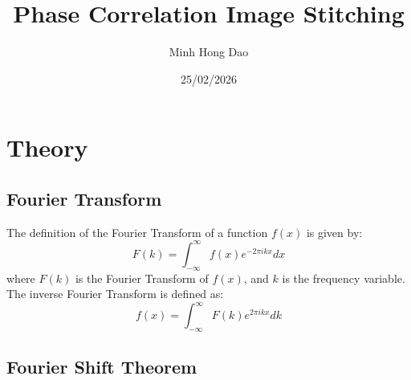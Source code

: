 \documentclass[11pt, a4paper]{article}
\title{Phase Correlation Image Stitching}
\author{Minh Hong Dao}
\date{25/02/2026}
\begin{document}
\maketitle


\section{Theory}
\subsection {Fourier Transform}
The definition of the Fourier Transform of a function \( f(x) \) is given by:
\begin{equation}
F(k) = \int_{-\infty}^{\infty} f(x) e^{-2\pi i k x} dx
\end{equation}
where \( F(k) \) is the Fourier Transform of \( f(x) \), and \( k \) is the frequency variable. The inverse Fourier Transform is defined as:
\begin{equation}
f(x) = \int_{-\infty}^{\infty} F(k) e^{2\pi i k x} dk
\end{equation}


\subsection {Fourier Shift Theorem}
\end{document}
